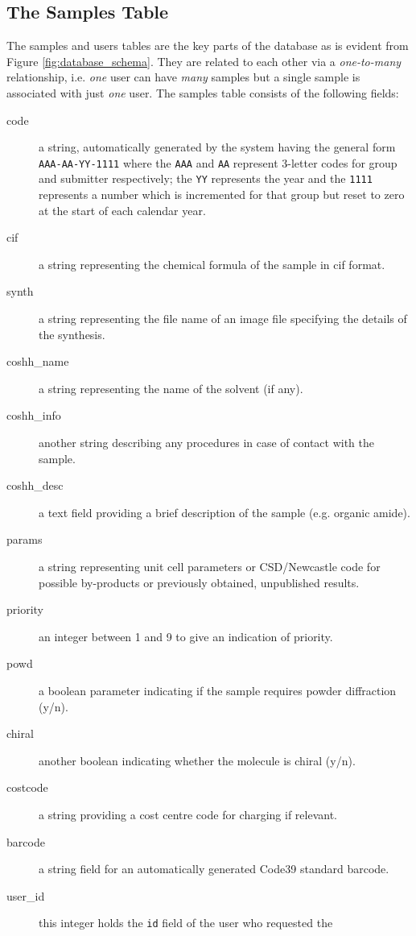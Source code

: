 \documentclass[12pt,twoside]{article}
\begin{document}
\subsection{The Samples Table}
The samples and users tables are the key parts of the database as is
evident from Figure \ref{fig:database_schema}. They are related to each
other via a \emph{one-to-many} relationship, i.e. \emph{one} user
can have \emph{many} samples but a single sample is associated with
just \emph{one} user. The samples table consists of the following fields:
\begin{description}
\item[code]
a string, automatically generated by the system having the
general form \verb=AAA-AA-YY-1111= where the \verb=AAA= and \verb=AA= 
represent 3-letter codes for group and submitter respectively; 
the \verb=YY= represents the year and the \verb=1111= represents a number 
which is incremented for that group but reset to zero at the start of each 
calendar year.
\item[cif]
a string representing the chemical formula of the sample in cif format.
\item[synth]
a string representing the file name of an image file specifying the details
of the synthesis.
\item[coshh\_name]
a string representing the name of the solvent (if any).
\item[coshh\_info]
another string describing any procedures in case of contact with the sample.
\item[coshh\_desc]
a text field providing a brief description of the sample (e.g. organic amide).
\item[params]
a string representing unit cell parameters
or CSD/Newcastle code for possible by-products or previously obtained, 
unpublished results.
\item[priority]
an integer between 1 and 9 to give an indication of priority.
\item[powd]
a boolean parameter indicating if the sample requires powder diffraction (y/n).
\item[chiral]
another boolean indicating whether the molecule is chiral (y/n).
\item[costcode]
a string providing a cost centre code for charging if relevant.
\item[barcode]
a string field for an automatically generated Code39 standard barcode.
\item[user\_id]
this integer holds the \verb=id= field of the user who requested the

\end{description}
\end{document}
